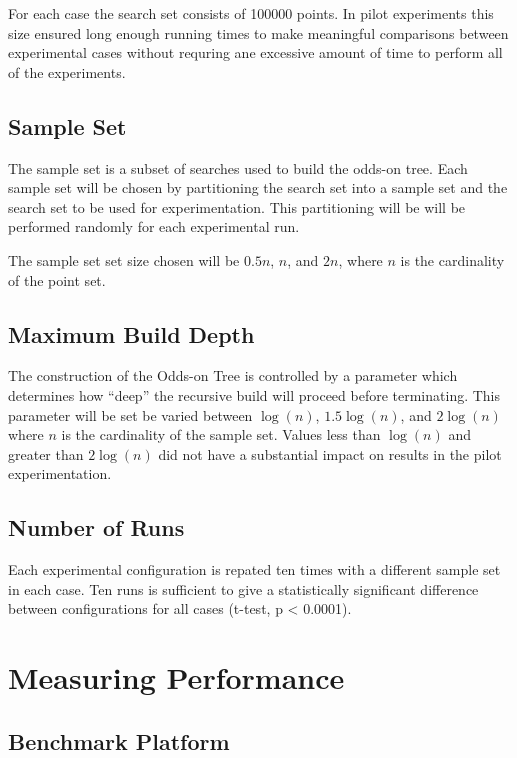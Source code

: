 \documentclass[mcs]{scsthesis}
\begin{document}
For each case the search set consists of 100000 points. In pilot experiments
this size ensured long enough running times to make meaningful comparisons
between experimental cases without requring ane excessive amount of time to
perform all of the experiments.

\subsection{Sample Set}

The sample set is a subset of searches used to build the odds-on tree. Each
sample set will be chosen by partitioning the search set into a sample set
and the search set to be used for experimentation. This partitioning will be
will be performed randomly for each experimental run.

The sample set set size chosen will be $0.5n$, $n$, and $2n$, where
$n$ is the cardinality of the point set.

\subsection{Maximum Build Depth}

The construction of the Odds-on Tree is controlled by a parameter which
determines how ``deep'' the recursive build will proceed before terminating.
This parameter will be set be varied between $\log(n)$, $1.5\log(n)$, and
$2\log(n)$ where $n$ is the cardinality of the sample set. Values less than
$\log(n)$ and greater than $2\log(n)$ did not have a substantial impact on
results in the pilot experimentation. 

\subsection{Number of Runs}

Each experimental configuration is repated ten times with a different sample set 
in each case. Ten runs is sufficient to give a statistically significant
difference between configurations for all cases (t-test, p < 0.0001).

\section{Measuring Performance}

\subsection{Benchmark Platform}
\end{document}
